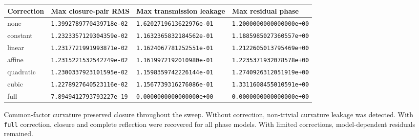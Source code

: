\documentclass[
  a4paper,
]{article}
\newcounter{none} %
\begin{document}
{\def\LTcaptype{none} %
\begin{longtable}[]{@{}
  >{\raggedright\arraybackslash}p{}
  >{\raggedleft\arraybackslash}p{}
  >{\raggedleft\arraybackslash}p{}
  >{\raggedleft\arraybackslash}p{}@{}}
\toprule\noalign{}
\begin{minipage}[b]{\linewidth}\raggedright
Correction
\end{minipage} & \begin{minipage}[b]{\linewidth}\raggedleft
Max closure-pair RMS
\end{minipage} & \begin{minipage}[b]{\linewidth}\raggedleft
Max transmission leakage
\end{minipage} & \begin{minipage}[b]{\linewidth}\raggedleft
Max residual phase
\end{minipage} \\
\midrule\noalign{}
\endhead
\bottomrule\noalign{}
\endlastfoot
none & \texttt{1.3992789770439718e-02} & \texttt{1.6202719613622976e-01}
& \texttt{1.2000000000000000e+00} \\
constant & \texttt{1.2323357129304359e-02} &
\texttt{1.1632365832184562e-01} & \texttt{1.1885985027360557e+00} \\
linear & \texttt{1.2317721991993871e-02} &
\texttt{1.1624067781252551e-01} & \texttt{1.2122605013795469e+00} \\
affine & \texttt{1.2315221532542749e-02} &
\texttt{1.1619972192010980e-01} & \texttt{1.2235371932078578e+00} \\
quadratic & \texttt{1.2300337923101595e-02} &
\texttt{1.1598359742226144e-01} & \texttt{1.2740926312051919e+00} \\
cubic & \texttt{1.2278927640523116e-02} &
\texttt{1.1567739316276086e-01} & \texttt{1.3311608455010591e+00} \\
full & \texttt{7.8949412793793227e-19} & \texttt{0.0000000000000000e+00}
& \texttt{0.0000000000000000e+00} \\
\end{longtable}
}

Common-factor curvature preserved closure throughout the sweep. Without
correction, non-trivial curvature leakage was detected. With
\texttt{full} correction, closure and complete reflection were recovered
for all phase models. With limited corrections, model-dependent
residuals remained.
\end{document}
